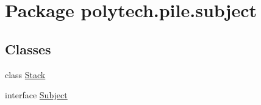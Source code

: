 \hypertarget{namespacepolytech_1_1pile_1_1subject}{}\section{Package polytech.\+pile.\+subject}
\label{namespacepolytech_1_1pile_1_1subject}
\subsection*{Classes}
\begin{DoxyCompactItemize}
\item 
class \hyperlink{classpolytech_1_1pile_1_1subject_1_1_stack}{Stack}
\item 
interface \hyperlink{interfacepolytech_1_1pile_1_1subject_1_1_subject}{Subject}
\end{DoxyCompactItemize}
